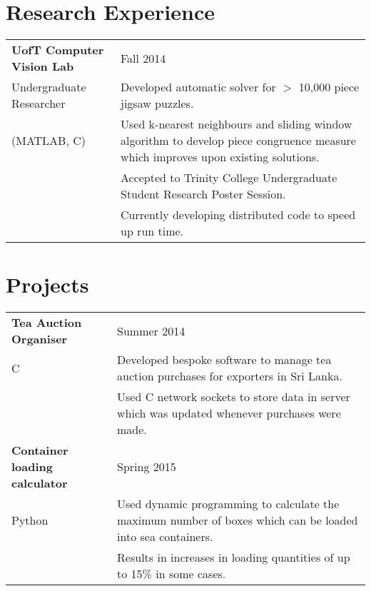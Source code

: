 \section*{Research Experience}
\begin{tabular}{P{4.5cm}|p{10.5cm}}
\textbf{UofT Computer Vision Lab} & Fall 2014\\
Undergraduate Researcher & Developed automatic solver for $>$ 10,000 piece jigsaw puzzles.\\
(MATLAB, C) & Used k-nearest neighbours and sliding window algorithm to develop piece congruence measure which improves upon existing solutions.\\
& Accepted to Trinity College Undergraduate Student Research Poster Session.\\
& Currently developing distributed code to speed up run time.
\end{tabular}

\section*{Projects}
\begin{tabular}{P{4.5cm}|p{10.5cm}}
\textbf{Tea Auction Organiser} & Summer 2014\\
C & Developed bespoke software to manage tea auction purchases for exporters in Sri Lanka.\\
 & Used C network sockets to store data in server which was updated whenever purchases were made.\\
\textbf{Container loading calculator} & Spring 2015\\
Python & Used dynamic programming to calculate the maximum number of boxes which can be loaded into sea containers.\\
& Results in increases in loading quantities of up to 15\% in some cases.\\
\end{tabular}


